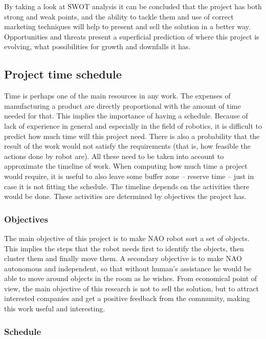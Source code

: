 By taking a look at SWOT analysis it can be concluded that the project has both strong and weak points, and the ability to tackle them and use of correct marketing techniques will help to present and sell the solution in a better way. Opportunities and threats present a superficial prediction of where this project is evolving, what possibilities for growth and downfalls it has.
		

	\subsection{Project time schedule}

	Time is perhaps one of the main resources in any work. The expenses of manufacturing a product are directly proportional with the amount of time needed for that. This implies the importance of having a schedule. Because of lack of experience in general and especially in the field of robotics, it is difficult to predict how much time will this project need. There is also a probability that the result of the work would not satisfy the requirements (that is, how feasible the actions done by robot are). All these need to be taken into account to approximate the timeline of work. When computing how much time a project would require, it is useful to also leave some buffer zone -- reserve time -- just in case it is not fitting the schedule. The timeline depends on the activities there would be done. These activities are determined by objectives the project has. 

		\subsubsection{Objectives}

		The main objective of this project is to make NAO robot sort a set of objects. This implies the steps that the robot needs first to identify the objects, then cluster them and finally move them. A secondary objective is to make NAO autonomous and independent, so that without human’s assistance he would be able to move around objects in the room as he wishes. From economical point of view, the main objective of this research is not to sell the solution, but to attract interested companies and get a positive feedback from the community, making this work useful and interesting.

		\subsubsection{Schedule}

